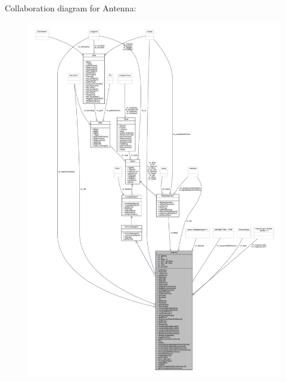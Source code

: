Collaboration diagram for Antenna\+:
\nopagebreak
\begin{figure}[H]
\begin{center}
\leavevmode
\includegraphics[width=350pt]{class_antenna__coll__graph}
\end{center}
\end{figure}
